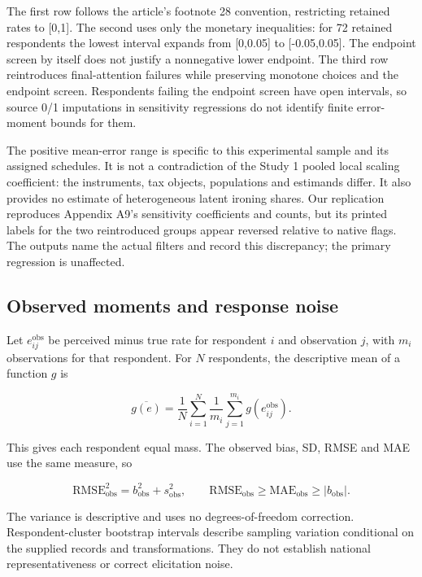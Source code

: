 \documentclass[
  11pt,
  letterpaper,
  DIV=11,
  numbers=noendperiod]{scrartcl}
\begin{document}
The first row follows the article's footnote 28 convention, restricting
retained rates to {[}0,1{]}. The second uses only the monetary
inequalities: for 72 retained respondents the lowest interval expands
from {[}0,0.05{]} to {[}-0.05,0.05{]}. The endpoint screen by itself
does not justify a nonnegative lower endpoint. The third row
reintroduces final-attention failures while preserving monotone choices
and the endpoint screen. Respondents failing the endpoint screen have
open intervals, so source 0/1 imputations in sensitivity regressions do
not identify finite error-moment bounds for them.

The positive mean-error range is specific to this experimental sample
and its assigned schedules. It is not a contradiction of the Study 1
pooled local scaling coefficient: the instruments, tax objects,
populations and estimands differ. It also provides no estimate of
heterogeneous latent ironing shares. Our replication reproduces Appendix
A9's sensitivity coefficients and counts, but its printed labels for the
two reintroduced groups appear reversed relative to native flags. The
outputs name the actual filters and record this discrepancy; the primary
regression is unaffected.

\subsection{Observed moments and response
noise}\label{observed-moments-and-response-noise}

Let \(e^{\mathrm{obs}}_{ij}\) be perceived minus true rate for
respondent \(i\) and observation \(j\), with \(m_i\) observations for
that respondent. For \(N\) respondents, the descriptive mean of a
function \(g\) is

\[\overline{g(e)}=\frac{1}{N}\sum_{i=1}^{N}\frac{1}{m_i}
\sum_{j=1}^{m_i}g(e^{\mathrm{obs}}_{ij}).\]

This gives each respondent equal mass. The observed bias, SD, RMSE and
MAE use the same measure, so

\[\mathrm{RMSE}_{\mathrm{obs}}^2=b_{\mathrm{obs}}^2+s_{\mathrm{obs}}^2,
\qquad \mathrm{RMSE}_{\mathrm{obs}}\geq\mathrm{MAE}_{\mathrm{obs}}
\geq |b_{\mathrm{obs}}|.\]

The variance is descriptive and uses no degrees-of-freedom correction.
Respondent-cluster bootstrap intervals describe sampling variation
conditional on the supplied records and transformations. They do not
establish national representativeness or correct elicitation noise.
\end{document}
